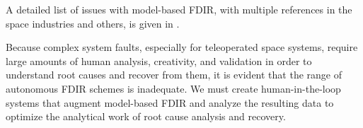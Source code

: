 A detailed list of issues with model-based FDIR, with multiple references in the space industries and others, is given in \cite{kurien2010intrinsic}.

Because complex system faults, especially for teleoperated space systems, require large amounts of human analysis, creativity, and validation in order to understand root causes and recover from them, it is evident that the range of autonomous FDIR schemes is inadequate. We must create human-in-the-loop systems that augment model-based FDIR and analyze the resulting data to optimize the analytical work of root cause analysis and recovery.